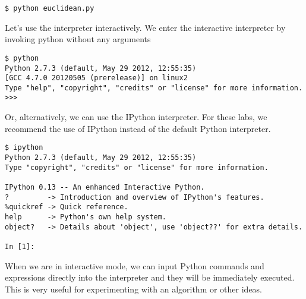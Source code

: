\begin{lstlisting}
$ python euclidean.py
\end{lstlisting}

Let's use the interpreter interactively.  We enter the interactive interpreter by invoking python without any arguments
\begin{lstlisting}
$ python
Python 2.7.3 (default, May 29 2012, 12:55:35) 
[GCC 4.7.0 20120505 (prerelease)] on linux2
Type "help", "copyright", "credits" or "license" for more information.
>>> 
\end{lstlisting}

Or, alternatively, we can use the IPython interpreter.  For these labs, we recommend the use of IPython instead of the default Python interpreter.
\begin{lstlisting}
$ ipython
Python 2.7.3 (default, May 29 2012, 12:55:35) 
Type "copyright", "credits" or "license" for more information.

IPython 0.13 -- An enhanced Interactive Python.
?         -> Introduction and overview of IPython's features.
%quickref -> Quick reference.
help      -> Python's own help system.
object?   -> Details about 'object', use 'object??' for extra details.

In [1]: 
\end{lstlisting}

When we are in interactive mode, we can input Python commands and expressions directly into the interpreter and they will be immediately executed.  This is very useful for experimenting with an algorithm or other ideas.